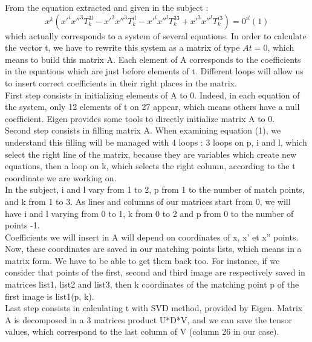 \documentclass[a4paper,10pt]{report}
\begin{document}
From the equation extracted and given in the subject :
\[x^{k}(x'^{i}x''^{3}T^{3l}_{k} - x'^{3}x''^{3}T^{il}_{k} - x'^{i}x''^{l}T^{33}_{k} + x'^{3}x''^{l}T^{i3}_{k}) = 0^{il}  (1)\]
which actually corresponds to a system of several equations. In order to calculate the vector t, we have to rewrite this system as 
a matrix of type \begin{math}At = 0\end{math}, which means to build this matrix A. Each element of A corresponds to the coefficients in the equations 
which are just before elements of t. Different loops will allow us to insert correct coefficients in their right places in the matrix.
\\

First step consists in initializing elements of A to 0. Indeed, in each equation of the system, only 12 elements of t on 27 appear, which 
means others have a null coefficient. Eigen provides some tools to directly initialize matrix A to 0.
\\

Second step consists in filling matrix A. When examining equation (1), we understand this filling will be managed with 4 loops : 3 loops 
on p, i and l, which select the right line of the matrix, because they are variables which create new equations, then a loop on k, which
 selects the right column, according to the t coordinate we are working on.
\\

In the subject, i and l vary from 1 to 2, p from 1 to the number of match points, and k from 1 to 3. As lines and columns of our 
matrices start from 0, we will have i and l varying from 0 to 1, k from 0 to 2 and p from 0 to the number of points -1.
\\

Coefficients we will insert in A will depend on coordinates of x, x’ et x” points. Now, these coordinates are saved in our matching points
 lists, which means in a matrix form. We have to be able to get them back too. For instance, if we consider that points of the first, 
second and third image are respectively saved in matrices list1, list2 and list3, then k coordinates of the matching point p of the 
first image is list1(p, k).
\\

Last step consists in calculating t with SVD method, provided by Eigen. Matrix A is decomposed in a 3 matrices product U*D*V, and we can save the tensor values, which correspond to the last column of V (column 26 in our case).
\\
\end{document}
